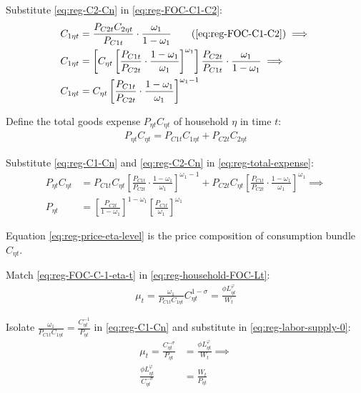 \documentclass[
	thesis.tex
	]{subfiles}
\begin{document}
Substitute \ref{eq:reg-C2-Cn} in \ref{eq:reg-FOC-C1-C2}:
\begin{align}
	C_{1\eta t} &= \frac{P_{C2t} C_{2\eta t}}{P_{C1t}} \cdot \frac{\omega_1}{1 -\omega_1} \tag{\ref{eq:reg-FOC-C1-C2}} \implies \nonumber \\
	C_{1\eta t} &= \left[ C_{\eta t} \left[ \frac{P_{C1t} }{P_{C2t}} \cdot \frac{1 -\omega_1}{\omega_1} \right]^{\omega_1} \right] \frac{P_{C2t}}{P_{C1t}} \cdot \frac{\omega_1}{1 -\omega_1} \implies \nonumber \\
	C_{1\eta t} &= C_{\eta t} \left[ \frac{P_{C1t} }{P_{C2t}} \cdot \frac{1 -\omega_1}{\omega_1} \right]^{\omega_1 -1} \label{eq:reg-C1-Cn}
\end{align}

Define the total goods expense $P_{\eta t} C_{\eta t}$ of household $\eta$ in time $t$:
\begin{align}
	P_{\eta t} C_{\eta t} = P_{C1 t} C_{1\eta t} + P_{C2 t} C_{2\eta t} \label{eq:reg-total-expense}
\end{align}

Substitute \ref{eq:reg-C1-Cn} and \ref{eq:reg-C2-Cn} in \ref{eq:reg-total-expense}:
\begin{align}
	P_{\eta t} C_{\eta t} &= P_{C1 t} C_{\eta t} \left[ \frac{P_{C1t} }{P_{C2t}} \cdot \frac{1 -\omega_1}{\omega_1} \right]^{\omega_1 -1} + P_{C2 t} C_{\eta t} \left[ \frac{P_{C1t} }{P_{C2t}} \cdot \frac{1 -\omega_1}{\omega_1} \right]^{\omega_1} \implies \nonumber \\
	P_{\eta t} &= \left[ \frac{P_{C2t}}{1 -\omega_1} \right]^{1 -\omega_1} \left[ \frac{P_{C1t}}{\omega_1} \right]^{\omega_1} \label{eq:reg-price-eta-level}
\end{align}

Equation \ref{eq:reg-price-eta-level} is the price composition of consumption bundle $C_{\eta t}$.

Match \ref{eq:reg-FOC-C-1-eta-t} in \ref{eq:reg-household-FOC-Lt}:
\begin{align}
	\mu_t = \frac{\omega_1}{P_{C1t} C_{1\eta t}} C_{\eta t}^{1 -\sigma} = \frac{\phi L_{\eta t}^{\varphi}}{W_t} \label{eq:reg-labor-supply-0}
\end{align}

Isolate $ \frac{\omega_1}{P_{C1t} C_{1\eta t}} = \frac{C_{\eta t}^{-1}}{P_{\eta t}} $ in \ref{eq:reg-C1-Cn} and substitute in \ref{eq:reg-labor-supply-0}:
	\begin{align}
		\mu_t = \frac{C_{\eta t}^{-\sigma}}{P_{\eta t}} &= \frac{\phi L_{\eta t}^{\varphi}}{W_t} \implies \label{eq:reg-FOC-Ct}\\
		\frac{\phi L_{\eta t}^{\varphi}}{C_{\eta t}^{-\sigma}} &= \frac{W_t}{P_{\eta t}} \label{eq:reg-labor-supply}
	\end{align}
\end{document}
